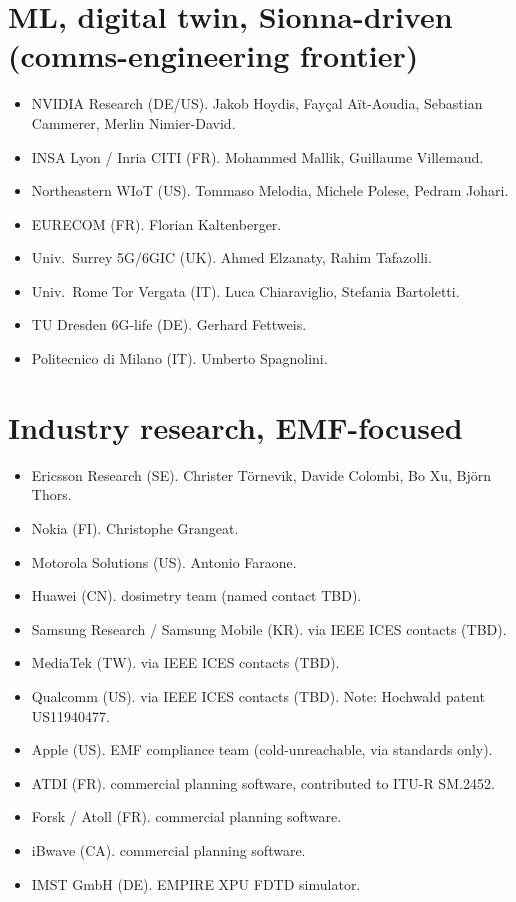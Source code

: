 \documentclass[10pt,a4paper]{article}
\begin{document}
\section{ML, digital twin, Sionna-driven (comms-engineering frontier)}
\begin{itemize}
  \item NVIDIA Research (DE/US). Jakob Hoydis, Fay\c{c}al A\"it-Aoudia, Sebastian Cammerer, Merlin Nimier-David.
  \item INSA Lyon / Inria CITI (FR). Mohammed Mallik, Guillaume Villemaud.
  \item Northeastern WIoT (US). Tommaso Melodia, Michele Polese, Pedram Johari.
  \item EURECOM (FR). Florian Kaltenberger.
  \item Univ.\ Surrey 5G/6GIC (UK). Ahmed Elzanaty, Rahim Tafazolli.
  \item Univ.\ Rome Tor Vergata (IT). Luca Chiaraviglio, Stefania Bartoletti.
  \item TU Dresden 6G-life (DE). Gerhard Fettweis.
  \item Politecnico di Milano (IT). Umberto Spagnolini.
\end{itemize}

\section{Industry research, EMF-focused}
\begin{itemize}
  \item Ericsson Research (SE). Christer T\"ornevik, Davide Colombi, Bo Xu, Bj\"orn Thors.
  \item Nokia (FI). Christophe Grangeat.
  \item Motorola Solutions (US). Antonio Faraone.
  \item Huawei (CN). dosimetry team (named contact TBD).
  \item Samsung Research / Samsung Mobile (KR). via IEEE ICES contacts (TBD).
  \item MediaTek (TW). via IEEE ICES contacts (TBD).
  \item Qualcomm (US). via IEEE ICES contacts (TBD). Note: Hochwald patent US11940477.
  \item Apple (US). EMF compliance team (cold-unreachable, via standards only).
  \item ATDI (FR). commercial planning software, contributed to ITU-R SM.2452.
  \item Forsk / Atoll (FR). commercial planning software.
  \item iBwave (CA). commercial planning software.
  \item IMST GmbH (DE). EMPIRE XPU FDTD simulator.
\end{itemize}
\end{document}
